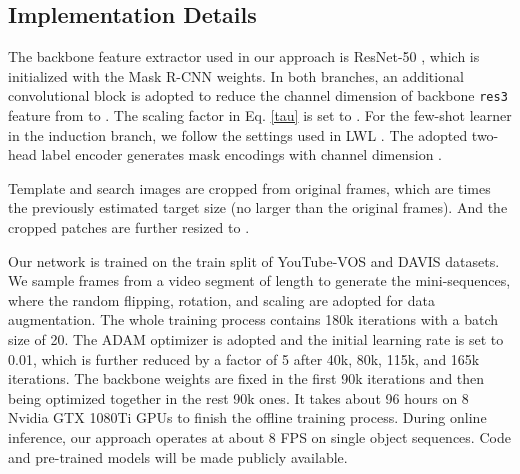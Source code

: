 \documentclass[10pt,twocolumn,letterpaper]{article}
\begin{document}
\subsection{Implementation Details}
The backbone feature extractor used in our approach is ResNet-50 \cite{resnet2016A}, which is initialized with the Mask R-CNN \cite{maskrcnn2017A} weights. In both branches, an additional convolutional block is adopted to reduce the channel dimension of backbone \texttt{res3} feature from  to . The scaling factor  in Eq. \eqref{tau} is set to . For the few-shot learner in the induction branch, we follow the settings used in LWL \cite{Goutam2020A}. The adopted two-head label encoder generates mask encodings with channel dimension .

Template and search images are cropped from original frames, which are  times the previously estimated target size (no larger than the original frames). And the cropped patches are further resized to .

Our network is trained on the train split of YouTube-VOS \cite{Xu2018YouTubeVOSAL} and DAVIS \cite{DAVIS2016} datasets. We sample  frames from a video segment of length  to generate the mini-sequences, where the random flipping, rotation, and scaling are adopted for data augmentation. The whole training process contains 180k iterations with a batch size of 20. The ADAM \cite{ADAM2015A} optimizer is adopted and the initial learning rate is set to 0.01, which is further reduced by a factor of 5 after 40k, 80k, 115k, and 165k iterations. The backbone weights are fixed in the first 90k iterations and then being optimized together in the rest 90k ones. It takes about 96 hours on 8 Nvidia GTX 1080Ti GPUs to finish the offline training process. During online inference, our approach operates at about 8 FPS on single object sequences.
Code and pre-trained models will be made publicly available.
\end{document}
